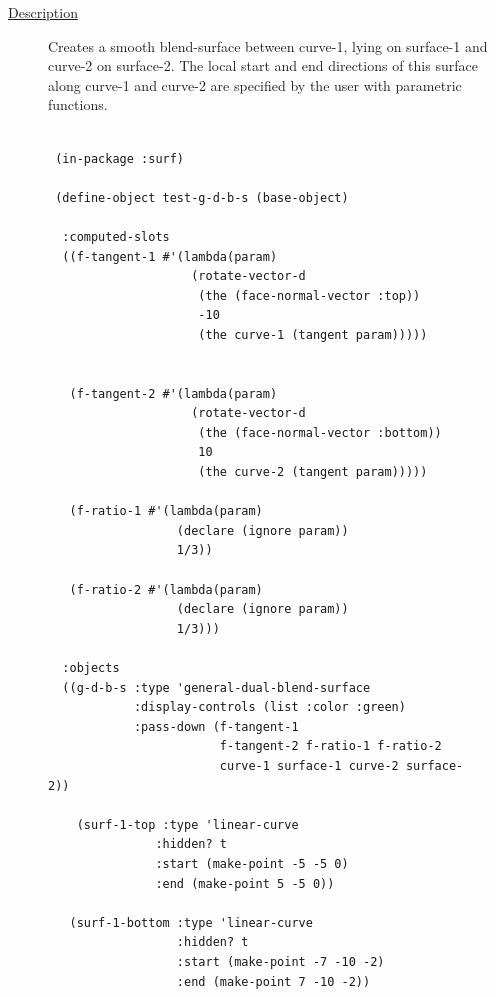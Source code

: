\documentclass [11pt]{book}
\begin{document}
\begin{itemize}
\begin{description}

\item [
\underline{Description}]


Creates a smooth blend-surface between curve-1, lying on surface-1 and curve-2 on surface-2. The local start and end directions of this surface along curve-1 and curve-2 are specified by the user with parametric functions.



\end{description}




\begin{figure}
\begin{lrbox}{\boxedverb}
\begin{minipage}{\linewidth}
{\small

\begin{verbatim}

 (in-package :surf)

 (define-object test-g-d-b-s (base-object)
  
  :computed-slots
  ((f-tangent-1 #'(lambda(param)
                    (rotate-vector-d 
                     (the (face-normal-vector :top))
                     -10
                     (the curve-1 (tangent param)))))
                    
   
   (f-tangent-2 #'(lambda(param)
                    (rotate-vector-d 
                     (the (face-normal-vector :bottom))
                     10
                     (the curve-2 (tangent param)))))
   
   (f-ratio-1 #'(lambda(param)
                  (declare (ignore param))
                  1/3))
   
   (f-ratio-2 #'(lambda(param)
                  (declare (ignore param))
                  1/3)))
   
  :objects
  ((g-d-b-s :type 'general-dual-blend-surface
            :display-controls (list :color :green)
            :pass-down (f-tangent-1 
                        f-tangent-2 f-ratio-1 f-ratio-2
                        curve-1 surface-1 curve-2 surface-2))
                                    
    (surf-1-top :type 'linear-curve
               :hidden? t
               :start (make-point -5 -5 0)
               :end (make-point 5 -5 0))
    
   (surf-1-bottom :type 'linear-curve
                  :hidden? t
                  :start (make-point -7 -10 -2)
                  :end (make-point 7 -10 -2))
    

\end{verbatim}}
\end{minipage}
\end{lrbox}
\end{figure}
\end{itemize}
\end{document}
